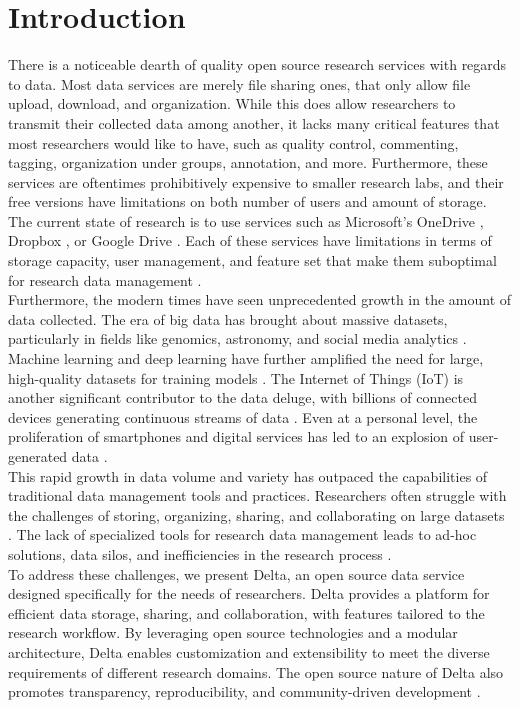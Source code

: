 \documentclass[conference]{IEEEtran}
\begin{document}
\section{Introduction}
There is a noticeable dearth of quality open source research services with regards to data.
Most data services are merely file sharing ones, that only allow file upload, download, and organization.
While this does allow researchers to transmit their collected data among another,
it lacks many critical features that most researchers would like to have, such as
quality control, commenting, tagging, organization under groups, annotation, and more.
Furthermore, these services are oftentimes prohibitively expensive to smaller research labs, and their
free versions have limitations on both number of users and amount of storage.
The current state of research is to use services such as Microsoft's OneDrive \cite{onedrive}, Dropbox \cite{dropbox},
or Google Drive \cite{googledrive}. Each of these services have limitations in terms of storage capacity, user management,
and feature set that make them suboptimal for research data management \cite{kowalczyk2018data}.
\\
Furthermore, the modern times have seen unprecedented growth in the amount of data collected.
The era of big data has brought about massive datasets, particularly in fields like genomics, astronomy, and social media analytics \cite{stephens2015big}.
Machine learning and deep learning have further amplified the need for large, high-quality datasets for training models \cite{sun2017revisiting}.
The Internet of Things (IoT) is another significant contributor to the data deluge, with billions of connected devices generating continuous streams of data \cite{khan2018iot}.
Even at a personal level, the proliferation of smartphones and digital services has led to an explosion of user-generated data \cite{reinsel2018digitization}.
\\
This rapid growth in data volume and variety has outpaced the capabilities of traditional data management tools and practices.
Researchers often struggle with the challenges of storing, organizing, sharing, and collaborating on large datasets \cite{wallis2013if}.
The lack of specialized tools for research data management leads to ad-hoc solutions, data silos, and inefficiencies in the research process \cite{wilkinson2016fair}.
\\
To address these challenges, we present Delta, an open source data service designed specifically for the needs of researchers.
Delta provides a platform for efficient data storage, sharing, and collaboration, with features tailored to the research workflow.
By leveraging open source technologies and a modular architecture, Delta enables customization and extensibility to meet the diverse requirements of different research domains.
The open source nature of Delta also promotes transparency, reproducibility, and community-driven development \cite{gezelter2015open}.
\end{document}
